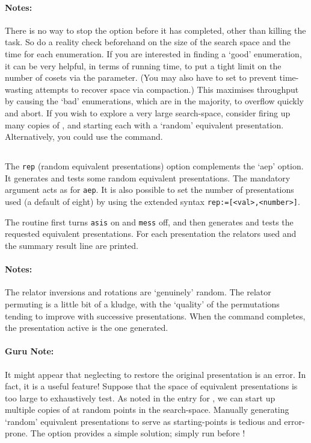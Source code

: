 \paragraph{Notes:}
There is no way to stop the  option before it has completed,
  other than killing the task.
So do a reality check beforehand on the size of the search space and the 
  time for each enumeration.
If you are interested in finding a `good' enumeration, it can be very
  helpful, in terms of running time, to put a tight limit on the number of
  cosets via the  parameter.
(You may also have to set  to prevent time-wasting attempts
  to recover space via compaction.)
This maximises throughput by causing the `bad' enumerations, which are in
  the majority, to overflow quickly and abort.
If you wish to explore a very large search-space, consider firing up many
  copies of \ace, and starting each with a `random' equivalent
  presentation.
Alternatively, you could use the  command.

\subsection{}
\label{cmd:rep}
The {\tt rep} (random equivalent presentations) option complements the
  `aep' option.
It generates and tests some random equivalent presentations.
The mandatory argument acts as for {\tt aep}.
It is also possible to set the number of presentations used (a default of
eight) by using the extended syntax {\tt rep:=[<val>,<number>]}. 

The routine first turns {\tt asis} on and {\tt mess} off, and then 
  generates and tests the requested equivalent presentations.
For each presentation the relators used and the summary result line are
  printed.

\paragraph{Notes:}
The relator inversions and rotations are `genuinely' random.
The relator permuting is a little bit of a kludge, with the `quality' of
  the permutations tending to improve with successive presentations. 
When the  command completes, the presentation active is the 
   one generated.

\paragraph{Guru Note:}
It might appear that neglecting to restore the original presentation is an
  error.
In fact, it is a useful feature!
Suppose that the space of equivalent presentations is too large to
  exhaustively test.
As noted in the entry for , we can start up multiple copies of
   at random points in the search-space.
Manually generating `random' equivalent presentations to serve as
  starting-points is tedious and error-prone.
The  option provides a simple solution; simply run 
  before !

